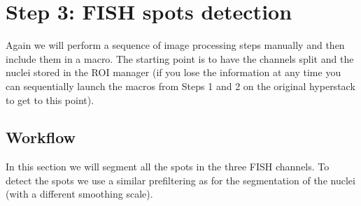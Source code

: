 \section{Step 3: FISH spots detection}

Again we will perform a sequence of image processing steps manually and then include them in a macro. The starting point is to have the channels split and the nuclei stored in the ROI manager (if you lose the information at any time you can sequentially launch the macros from Steps 1 and 2 on the original hyperstack to get to this point).

\subsection{Workflow}
In this section we will segment all the spots in the three FISH channels. To detect the spots we use a similar prefiltering as for the segmentation of the nuclei (with a different smoothing scale).